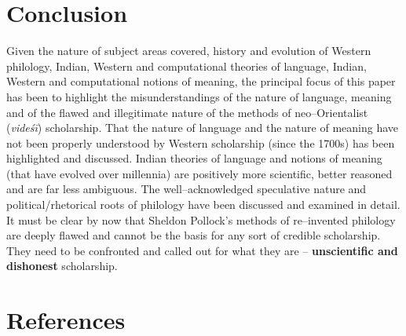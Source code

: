 \section*{Conclusion}

Given the nature of subject areas covered, history and evolution of Western philology, Indian, Western and computational theories of language, Indian, Western and computational notions of meaning, the principal focus of this paper has been to highlight the misunderstandings of the nature of language, meaning and of the flawed and illegitimate nature of the methods of neo–Orientalist (\textit{videśī}) scholarship. That the nature of language and the nature of meaning have not been properly understood by Western scholarship (since the 1700s) has been highlighted and discussed. Indian theories of language and notions of meaning (that have evolved over millennia) are positively more scientific, better reasoned and are far less ambiguous. The well–acknowledged speculative nature and political/rhetorical roots of philology have been discussed and examined in detail. It must be clear by now that Sheldon Pollock’s methods of re–invented philology are deeply flawed and cannot be the basis for any sort of credible scholarship. They need to be confronted and called out for what they are – \textbf{unscientific and dishonest} scholarship.


\section*{References}


